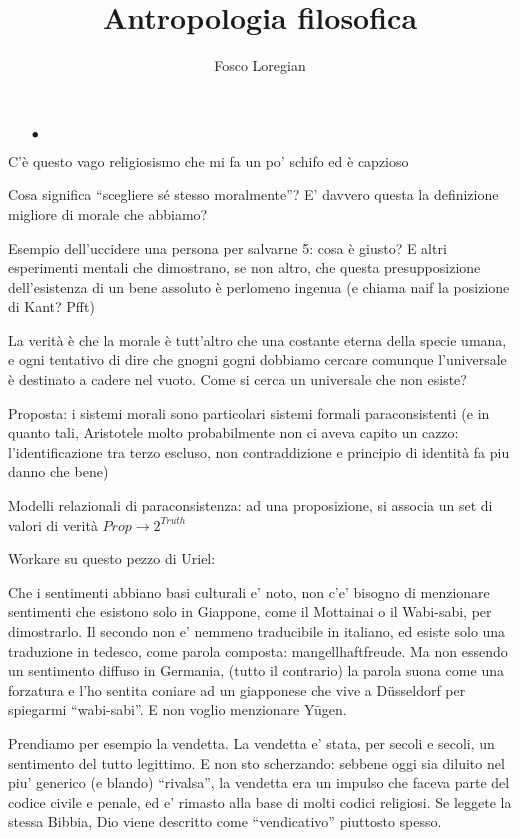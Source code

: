 \documentclass[dvipsnames]{amsart}
\title{Antropologia filosofica}
\author{Fosco Loregian}
\begin{document}
\maketitle 

\begin{itemize}
  \item[$\bullet$] 
\end{itemize}

C'è questo vago religiosismo che mi fa un po' schifo ed è capzioso

Cosa significa ``scegliere sé stesso moralmente''? E' davvero questa la definizione migliore di morale che abbiamo?

Esempio dell'uccidere una persona per salvarne 5: cosa è giusto? E altri esperimenti mentali che dimostrano, se non altro, che questa presupposizione dell'esistenza di un bene assoluto è perlomeno ingenua (e chiama naif la posizione di Kant? Pfft)

La verità è che la morale è tutt'altro che una costante eterna della specie umana, e ogni tentativo di dire che gnogni gogni dobbiamo cercare comunque l'universale è destinato a cadere nel vuoto. Come si cerca un universale che non esiste?

Proposta: i sistemi morali sono particolari sistemi formali paraconsistenti (e in quanto tali, Aristotele molto probabilmente non ci aveva capito un cazzo: l'identificazione tra terzo escluso, non contraddizione e principio di identità fa piu danno che bene)

Modelli relazionali di paraconsistenza: ad una proposizione, si associa un set di valori di verità $Prop \to 2^{Truth}$

Workare su questo pezzo di Uriel:


  Che i sentimenti abbiano basi culturali e’ noto, non c’e’ bisogno di menzionare sentimenti che esistono solo in Giappone, come il Mottainai o il Wabi-sabi, per dimostrarlo. Il secondo non e’ nemmeno traducibile in italiano, ed esiste solo una traduzione in tedesco, come parola composta: mangellhaftfreude. Ma non essendo un sentimento diffuso in Germania, (tutto il contrario) la parola suona come una forzatura e l’ho sentita coniare ad un giapponese che vive a Düsseldorf per spiegarmi “wabi-sabi”. E non voglio menzionare Yūgen.

  Prendiamo per esempio la vendetta. La vendetta e’ stata, per secoli e secoli, un sentimento del tutto legittimo. E non sto scherzando: sebbene oggi sia diluito nel piu’ generico (e blando) “rivalsa”, la vendetta era un impulso che faceva parte del codice civile e penale, ed e’ rimasto alla base di molti codici religiosi. Se leggete la stessa Bibbia, Dio viene descritto come “vendicativo” piuttosto spesso.
  
\end{document}
